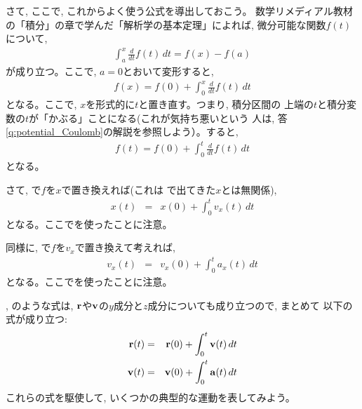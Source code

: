 さて, ここで, これからよく使う公式を導出しておこう。
数学リメディアル教材の「積分」の章で学んだ「解析学の基本定理」によれば, 
微分可能な関数$f(t)$について, 
\begin{eqnarray}
\int_a^x\frac{d}{dt}f(t)\,dt=f(x)-f(a)\label{eq:ftsekibun00}
\end{eqnarray}
が成り立つ。ここで, $a=0$とおいて変形すると, 
\begin{eqnarray}
f(x)=f(0)+\int_0^x\frac{d}{dt}f(t)\,dt
\end{eqnarray}
となる。ここで, $x$を形式的に$t$と置き直す。つまり, 積分区間の
上端の$t$と積分変数の$t$が「かぶる」ことになる(これが気持ち悪いという
人は, 答\ref{q:potential_Coulomb}の解説を参照しよう）。すると, 
\begin{eqnarray}
f(t)=f(0)+\int_{0}^{t}\frac{d}{dt}f(t)\,dt\label{eq:ftsekibun}
\end{eqnarray}
となる。

さて, で$f$を$x$で置き換えれば(これは
で出てきた$x$とは無関係), 
\begin{eqnarray}
x(t)&=&x(0)+\int_{0}^{t}v_x(t)\, dt\label{eq:xfromvx}
\end{eqnarray}
となる。ここでを使ったことに注意。

同様に, で$f$を$v_x$で置き換えて考えれば, 
\begin{eqnarray}
v_x(t)&=&v_x(0)+\int_{0}^{t}a_x(t)\, dt\label{eq:vxfromax}
\end{eqnarray}
となる。ここでを使ったことに注意。

, のような式は, 
${\bf r}$や${\bf v}$の$y$成分と$z$成分についても成り立つので, まとめて
以下の式が成り立つ:
\begin{eqnarray}
{\bf r}(t)&=&{\bf r}(0)+\int_{0}^{t}{\bf v}(t)\, dt\label{eq:rfromv_vec}\\
{\bf v}(t)&=&{\bf v}(0)+\int_{0}^{t}{\bf a}(t)\, dt\label{eq:vfroma_vec}
\end{eqnarray}
これらの式を駆使して, いくつかの典型的な運動を表してみよう。
\hv

